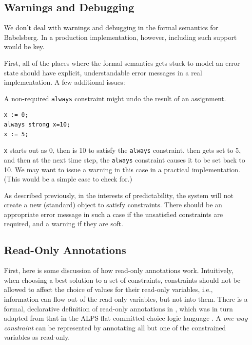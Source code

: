 \documentclass{article}
\begin{document}
\subsection{Warnings and Debugging}
\label{sec:warnings-and-debugging}

We don't deal with warnings and debugging in the formal semantics for
Babelsberg.  In a production implementation, however, including such
support would be key.

First, all of the places where the formal semantics gets stuck to
model an error state should have explicit, understandable error
messages in a real implementation.  A few additional issues:

A non-required \verb|always| constraint might undo the result of an
assignment.

\begin{verbatim}
x := 0;
always strong x=10;
x := 5;
\end{verbatim}

\verb|x| starts out as 0, then is 10 to satisfy the \verb|always|
constraint, then gets set to 5, and then at the next time step, the
\verb|always| constraint causes it to be set back to 10.  We may want
to issue a warning in this case in a practical implementation.  (This
would be a simple case to check for.)

As described previously, in the interests of predictability, the
system will not create a new (standard) object to satisfy constraints.
There should be an appropriate error message in such a case if the
unsatisfied constraints are required, and a warning if they are soft.

\subsection{Read-Only Annotations}
\label{sec:read-only-annotations}

First, here is some discussion of how read-only annotations work.
Intuitively, when choosing a best solution to a set of constraints,
constraints should not be allowed to affect the choice of values for
their read-only variables, i.e., information can flow out of the
read-only variables, but not into them.  There is a formal,
declarative definition of read-only annotations in
\cite{borning-lisp-symbolic-computation-1992}, which was in turn
adapted from that in the ALPS flat committed-choice logic language
\cite{maher-iclp-1987}.  A \emph{one-way constraint} can be
represented by annotating all but one of the constrained variables as
read-only.
\end{document}
